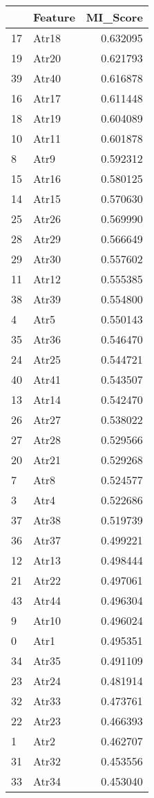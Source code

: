 \begin{tabular}{llr}
\toprule
 & Feature & MI_Score \\
\midrule
17 & Atr18 & 0.632095 \\
19 & Atr20 & 0.621793 \\
39 & Atr40 & 0.616878 \\
16 & Atr17 & 0.611448 \\
18 & Atr19 & 0.604089 \\
10 & Atr11 & 0.601878 \\
8 & Atr9 & 0.592312 \\
15 & Atr16 & 0.580125 \\
14 & Atr15 & 0.570630 \\
25 & Atr26 & 0.569990 \\
28 & Atr29 & 0.566649 \\
29 & Atr30 & 0.557602 \\
11 & Atr12 & 0.555385 \\
38 & Atr39 & 0.554800 \\
4 & Atr5 & 0.550143 \\
35 & Atr36 & 0.546470 \\
24 & Atr25 & 0.544721 \\
40 & Atr41 & 0.543507 \\
13 & Atr14 & 0.542470 \\
26 & Atr27 & 0.538022 \\
27 & Atr28 & 0.529566 \\
20 & Atr21 & 0.529268 \\
7 & Atr8 & 0.524577 \\
3 & Atr4 & 0.522686 \\
37 & Atr38 & 0.519739 \\
36 & Atr37 & 0.499221 \\
12 & Atr13 & 0.498444 \\
21 & Atr22 & 0.497061 \\
43 & Atr44 & 0.496304 \\
9 & Atr10 & 0.496024 \\
0 & Atr1 & 0.495351 \\
34 & Atr35 & 0.491109 \\
23 & Atr24 & 0.481914 \\
32 & Atr33 & 0.473761 \\
22 & Atr23 & 0.466393 \\
1 & Atr2 & 0.462707 \\
31 & Atr32 & 0.453556 \\
33 & Atr34 & 0.453040 \\

\end{tabular}
